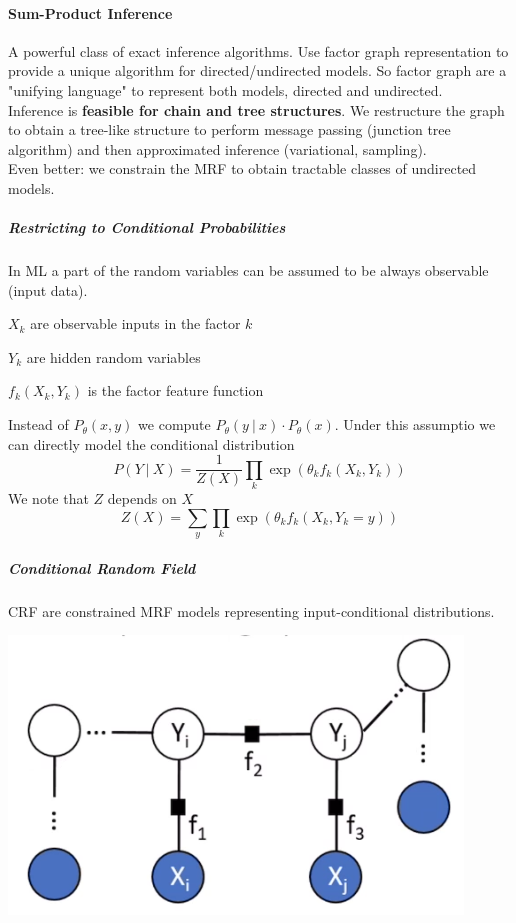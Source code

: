 \documentclass[10pt]{report}
\begin{document}
\paragraph{Sum-Product Inference} A powerful class of exact inference algorithms. Use factor graph representation to provide a unique algorithm for directed/undirected models. So factor graph are a "unifying language" to represent both models, directed and undirected.\\
Inference is \textbf{feasible for chain and tree structures}. We restructure the graph to obtain a tree-like structure to perform message passing (junction tree algorithm) and then approximated inference (variational, sampling).\\
Even better: we constrain the MRF to obtain tractable classes of undirected models.
\subparagraph{Restricting to Conditional Probabilities} In ML a part of the random variables can be assumed to be always observable (input data).\begin{list}{}{}
	\item $X_k$ are observable inputs in the factor $k$
	\item $Y_k$ are hidden random variables
	\item $f_k(X_k, Y_k)$ is the factor feature function
\end{list}
Instead of $P_\theta(x,y)$ we compute $P_\theta(y\:|\:x)\cdot P_\theta(x)$. Under this assumptio we can directly model the conditional distribution $$P(Y\:|\:X) = \frac{1}{Z(X)}\prod_k \exp\left(\theta_kf_k(X_k,Y_k)\right)$$
We note that $Z$ depends on $X$
$$Z(X) = \sum_y\prod_k\exp\left(\theta_kf_k(X_k,Y_k = y)\right)$$
\subparagraph{Conditional Random Field} CRF are constrained MRF models representing input-conditional distributions.
\begin{center}
	\includegraphics[scale=0.5]{35.png}
\end{center}
\end{document}
